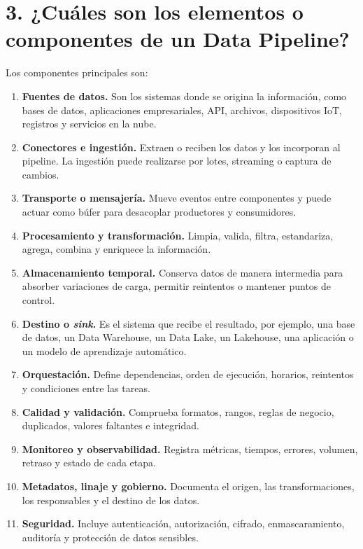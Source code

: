 \section*{3. ¿Cuáles son los elementos o componentes de un Data Pipeline?}

Los componentes principales son:

\begin{enumerate}
    \item \textbf{Fuentes de datos.} Son los sistemas donde se origina la
    información, como bases de datos, aplicaciones empresariales, API, archivos,
    dispositivos IoT, registros y servicios en la nube.

    \item \textbf{Conectores e ingestión.} Extraen o reciben los datos y los
    incorporan al pipeline. La ingestión puede realizarse por lotes, streaming o
    captura de cambios.

    \item \textbf{Transporte o mensajería.} Mueve eventos entre componentes y
    puede actuar como búfer para desacoplar productores y consumidores.

    \item \textbf{Procesamiento y transformación.} Limpia, valida, filtra,
    estandariza, agrega, combina y enriquece la información.

    \item \textbf{Almacenamiento temporal.} Conserva datos de manera
    intermedia para absorber variaciones de carga, permitir reintentos o
    mantener puntos de control.

    \item \textbf{Destino o \textit{sink}.} Es el sistema que recibe el
    resultado, por ejemplo, una base de datos, un Data Warehouse, un Data Lake,
    un Lakehouse, una aplicación o un modelo de aprendizaje automático.

    \item \textbf{Orquestación.} Define dependencias, orden de ejecución,
    horarios, reintentos y condiciones entre las tareas.

    \item \textbf{Calidad y validación.} Comprueba formatos, rangos, reglas de
    negocio, duplicados, valores faltantes e integridad.

    \item \textbf{Monitoreo y observabilidad.} Registra métricas, tiempos,
    errores, volumen, retraso y estado de cada etapa.

    \item \textbf{Metadatos, linaje y gobierno.} Documenta el origen, las
    transformaciones, los responsables y el destino de los datos.

    \item \textbf{Seguridad.} Incluye autenticación, autorización, cifrado,
    enmascaramiento, auditoría y protección de datos sensibles.
\end{enumerate}

